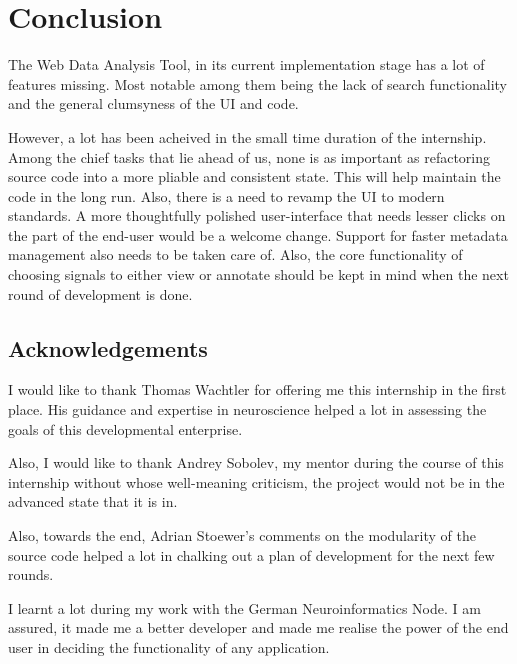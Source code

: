 \chapter{Conclusion}

The Web Data Analysis Tool, in its current implementation stage has a
lot of features missing.  Most notable among them being the lack of
search functionality and the general clumsyness of the UI and code.

However, a lot has been acheived in the small time duration of the
internship.  Among the chief tasks that lie ahead of us, none is as
important as refactoring source code into a more pliable and
consistent state.  This will help maintain the code in the long run.
Also, there is a need to revamp the UI to modern standards.  A more
thoughtfully polished user-interface that needs lesser clicks on the
part of the end-user would be a welcome change.  Support for faster
metadata management also needs to be taken care of.  Also, the core
functionality of choosing signals to either view or annotate should be
kept in mind when the next round of development is done.


\section{Acknowledgements}

I would like to thank Thomas Wachtler for offering me this internship
in the first place.  His guidance and expertise in neuroscience helped
a lot in assessing the goals of this developmental enterprise.

Also, I would like to thank Andrey Sobolev, my mentor during the
course of this internship without whose well-meaning criticism, the
project would not be in the advanced state that it is in.

Also, towards the end, Adrian Stoewer's comments on the modularity of
the source code helped a lot in chalking out a plan of development for
the next few rounds. 

I learnt a lot during my work with the German Neuroinformatics Node. I
am assured, it made me a better developer and made me realise the
power of the end user in deciding the functionality of any
application.
